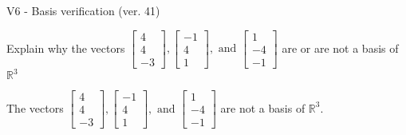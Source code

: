 \begin{exercise}
  \begin{exerciseTitle}V6 - Basis verification (ver. 41)\end{exerciseTitle}
  \begin{exerciseStatement}
    Explain why the vectors \(\left[\begin{array}{r}
4 \\
4 \\
-3
\end{array}\right] , \left[\begin{array}{r}
-1 \\
4 \\
1
\end{array}\right] , \text{ and } \left[\begin{array}{r}
1 \\
-4 \\
-1
\end{array}\right]\) are or are not a basis of \(\mathbb{R}^3\)	


  \end{exerciseStatement}
  \begin{exerciseAnswer}
   The vectors \(\left[\begin{array}{r}
4 \\
4 \\
-3
\end{array}\right] , \left[\begin{array}{r}
-1 \\
4 \\
1
\end{array}\right] , \text{ and } \left[\begin{array}{r}
1 \\
-4 \\
-1
\end{array}\right]\) 
  	 are not  a basis of \(\mathbb{R}^3\).
  


  \end{exerciseAnswer}
\end{exercise}